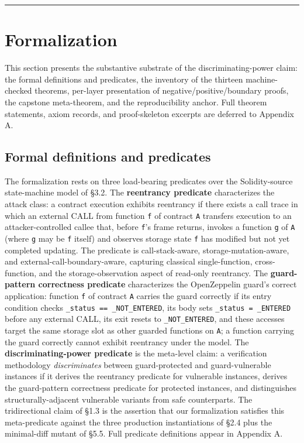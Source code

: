 \begin{center}\rule{0.5\linewidth}{0.5pt}\end{center}

\section{Formalization}\label{formalization}

This section presents the substantive substrate of the
discriminating-power claim: the formal definitions and predicates, the
inventory of the thirteen machine-checked theorems, per-layer
presentation of negative/positive/boundary proofs, the capstone
meta-theorem, and the reproducibility anchor. Full theorem statements,
axiom records, and proof-skeleton excerpts are deferred to Appendix A.

\subsection{Formal definitions and
predicates}\label{formal-definitions-and-predicates}

The formalization rests on three load-bearing predicates over the
Solidity-source state-machine model of §3.2. The \textbf{reentrancy
predicate} characterizes the attack class: a contract execution exhibits
reentrancy if there exists a call trace in which an external CALL from
function \texttt{f} of contract \texttt{A} transfers execution to an
attacker-controlled callee that, before \texttt{f}'s frame returns,
invokes a function \texttt{g} of \texttt{A} (where \texttt{g} may be
\texttt{f} itself) and observes storage state \texttt{f} has modified
but not yet completed updating. The predicate is call-stack-aware,
storage-mutation-aware, and external-call-boundary-aware, capturing
classical single-function, cross-function, and the storage-observation
aspect of read-only reentrancy. The \textbf{guard-pattern correctness
predicate} characterizes the OpenZeppelin guard's correct application:
function \texttt{f} of contract \texttt{A} carries the guard correctly
if its entry condition checks \texttt{\_status\ ==\ \_NOT\_ENTERED}, its
body sets \texttt{\_status\ =\ \_ENTERED} before any external CALL, its
exit resets to \texttt{\_NOT\_ENTERED}, and these accesses target the
same storage slot as other guarded functions on \texttt{A}; a function
carrying the guard correctly cannot exhibit reentrancy under the model.
The \textbf{discriminating-power predicate} is the meta-level claim: a
verification methodology \emph{discriminates} between guard-protected
and guard-vulnerable instances if it derives the reentrancy predicate
for vulnerable instances, derives the guard-pattern correctness
predicate for protected instances, and distinguishes
structurally-adjacent vulnerable variants from safe counterparts. The
tridirectional claim of §1.3 is the assertion that our formalization
satisfies this meta-predicate against the three production
instantiations of §2.4 plus the minimal-diff mutant of §5.5. Full
predicate definitions appear in Appendix A.

